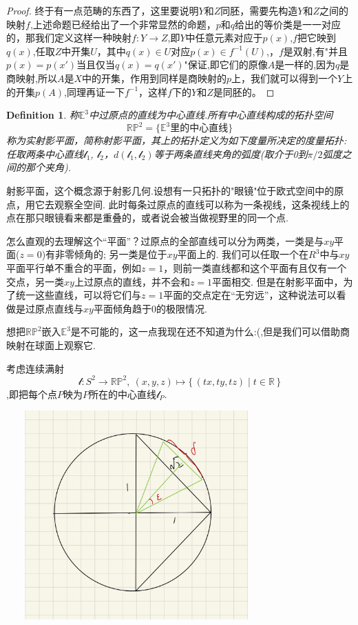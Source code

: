 \documentclass{article}
\newtheorem{definition}[theorem]{Definition}
\newcommand*{\xfunc}[4]{{#2}\colon{#3}{#1}{#4}}
\newcommand*{\func}[3]{\xfunc{\to}{#1}{#2}{#3}}
\newcommand\Set[2]{\{\,#1\mid#2\,\}} %
\begin{document}
\begin{proof}
终于有一点范畴的东西了，这里要说明$Y$和$Z$同胚，需要先构造$Y$和$Z$之间的映射$f$,上述命题已经给出了一个非常显然的命题，$p$和$q$给出的等价类是一一对应的，那我们定义这样一种映射$\func{f}{Y}{Z}$,即$Y$中任意元素对应于$p(x)$,$f$把它映到$q(x)$,任取$Z$中开集$U$，其中$q(x) \in U$对应$p(x) \in f^{-1}(U)$,，$f$是双射,有"并且$p(x)=p(x')$当且仅当$q(x)=q(x')$"保证,即它们的原像$A$是一样的,因为$q$是商映射,所以$A$是$X$中的开集，作用到同样是商映射的$p$上，我们就可以得到一个$Y$上的开集$p(A)$,同理再证一下$f^{-1}$，这样$f$下的$Y$和$Z$是同胚的。
\end{proof}

\begin{definition}
称$\mathbb{E}^3$中过原点的直线为中心直线.所有中心直线构成的拓扑空间\[\mathbb{R}\mathbb{P}^2=\{\mathbb{E}^3\text{里的中心直线}\}\]称为实射影平面，简称射影平面，其上的拓扑定义为如下度量所决定的度量拓扑: 任取两条中心直线$\mathcal{l}_1$, $\mathcal{l}_2$，$d(\mathcal{l}_1,\mathcal{l}_2)$等于两条直线夹角的弧度(取介于0到$\pi / 2$弧度之间的那个夹角).
\end{definition}

射影平面，这个概念源于射影几何.设想有一只拓扑的"眼镜"位于欧式空间中的原点，用它去观察全空间. 此时每条过原点的直线可以称为一条视线，这条视线上的点在那只眼镜看来都是重叠的，或者说会被当做视野里的同一个点.

怎么直观的去理解这个“平面”？过原点的全部直线可以分为两类，一类是与$xy$平面($z=0$)有非零倾角的; 另一类是位于$xy$平面上的. 我们可以任取一个在$R^3$中与$xy$平面平行单不重合的平面，例如$z=1$，则前一类直线都和这个平面有且仅有一个交点，另一类$xy$上过原点的直线，并不会和$z=1$平面相交. 但是在射影平面中，为了统一这些直线，可以将它们与$z=1$平面的交点定在“无穷远”，这种说法可以看做是过原点直线与$xy$平面倾角趋于0的极限情况.

想把$\mathbb{R}\mathbb{P}^2$嵌入$\mathbb{E}^3$是不可能的，这一点我现在还不知道为什么:(,但是我们可以借助商映射在球面上观察它.

考虑连续满射\[\func{\mathcal{l}}{S^2}{\mathbb{R}\mathbb{P}^2},\ (x,y,z) \mapsto \Set{(tx,ty,tz)}{t \in \mathbb{R}}\],即把每个点$P$映为$P$所在的中心直线$\mathcal{l}_P$.
\begin{center}
\includegraphics[width=10cm, height=8cm]{images/sp2.jpg}
\end{center}
\end{document}
